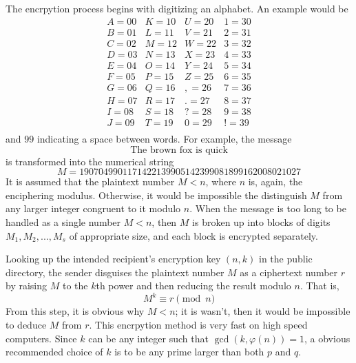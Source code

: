 \documentclass{article}
\newcounter{example}[section]
\begin{document}
The encrpytion process begins with digitizing an alphabet. An example would be 
\begin{equation}
  \begin{array}{cccc}
      A=00 & K=10 & U=20 & 1 = 30 \\
      B=01 & L=11 & V=21 & 2=31 \\
      C = 02 & M = 12 & W = 22 & 3 = 32 \\
      D = 03 & N = 13 & X = 23 & 4 = 33 \\
      E = 04 & O = 14 & Y = 24 & 5 = 34 \\
      F = 05 & P = 15 & Z = 25 & 6 = 35 \\
      G = 06 & Q = 16 & , = 26 & 7 = 36 \\
      H = 07 & R = 17 & . = 27 & 8 = 37 \\
      I = 08 & S = 18 & ? = 28 & 9 = 38 \\
      J = 09 & T = 19 & 0 = 29 & ! = 39 \\
  \end{array}
\end{equation}
and $99$ indicating a space between words. For example, the message
\begin{equation}
  \text{The brown fox is quick}
\end{equation}
is transformed into the numerical string
\begin{equation}
  M = 1907049901171422139905142399081899162008021027
\end{equation}
It is assumed that the plaintext number $M < n$, where $n$ is, again, the enciphering modulus. Otherwise, it would be impossible the distinguish $M$ from any larger integer congruent to it modulo $n$. When the message is too long to be handled as a single number $M<n$, then $M$ is broken up into blocks of digits $M_1, M_2, ..., M_s$ of appropriate size, and each block is encrypted separately. 

Looking up the intended recipient's encryption key $(n, k)$ in the public directory, the sender disguises the plaintext number $M$ as a ciphertext number $r$ by raising $M$ to the $k$th power and then reducing the result modulo $n$. That is, 
\begin{equation}
  M^k \equiv r \pmod{n}
\end{equation}
From this step, it is obvious why $M<n$; it is wasn't, then it would be impossible to deduce $M$ from $r$. This encrpytion method is very fast on high speed computers. Since $k$ can be any integer such that $\gcd(k, \varphi(n)) = 1$, a obvious recommended choice of $k$ is to be any prime larger than both $p$ and $q$. 
\end{document}
